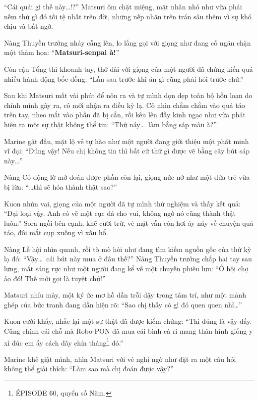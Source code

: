 \documentclass[../main.tex]{subfiles}
\begin{document}
``Cái quái gì thế này\dots!?'' Matsuri ôm chặt miệng, mặt nhăn nhó như vừa phải nếm thứ gì đó tồi tệ nhất trên đời, những nếp nhăn trên trán sâu thêm vì sự khó chịu và bất ngờ.

Nàng Thuyền trưởng nhảy cẫng lên, lo lắng gọi với giọng như đang cố ngăn chặn một thảm họa: ``\textbf{Matsuri-senpai à!}''

Còn cậu Tổng thì khoanh tay, thở dài với giọng của một người đã chứng kiến quá nhiều hành động bốc đồng: ``Lần sau trước khi ăn gì cũng phải hỏi trước chứ.''

\ct

Sau khi Matsuri mất vài phút để nôn ra và tự mình dọn dẹp toàn bộ hỗn loạn do chính mình gây ra, cô mới nhận ra điều kỳ lạ. Cô nhìn chằm chằm vào quả táo trên tay, nheo mắt vào phần đã bị cắn, rồi kêu lên đầy kinh ngạc như vừa phát hiện ra một sự thật không thể tin: ``Thứ náy\dots\ làm bằng sáp màu à?''

Marine gật đầu, mặt lộ vẻ tự hào như một người đang giới thiệu một phát minh vĩ đại: ``Đúng vậy! Nếu chị không tin thì bất cứ thứ gì được vẽ bằng cây bút sáp này\dots''

Nàng Cổ động lờ mờ đoán được phần còn lại, giọng nức nở như một đứa trẻ vừa bị lừa: ``\dots thì sẽ hóa thành thật sao?''

Kuon nhún vai, giọng của một người đã tự mình thử nghiệm và thấy kết quả: ``Đại loại vậy. Anh có vẽ một cục đá cho vui, không ngờ nó cũng thành thật luôn.'' Sora ngồi bên cạnh, khẽ cười trừ, vẻ mặt vẫn còn hơi áy náy về chuyện quả táo, đôi mắt cụp xuống vì xấu hổ.

Nàng Lễ hội nhìn quanh, rồi tò mò hỏi như đang tìm kiếm nguồn gốc của thứ kỳ lạ đó: ``Vậy\dots\ cái bút này mua ở đâu thế?'' Nàng Thuyền trưởng chắp hai tay sau lưng, mắt sáng rực như một người đang kể về một chuyến phiêu lưu: ``Ở hội chợ ảo đó! Thế mới gọi là tuyệt chứ!''

Matsuri nhíu mày, một ký ức mơ hồ dần trỗi dậy trong tâm trí, như một mảnh ghép của bức tranh đang dần hiện rõ: ``Sao chị thấy có gì đó quen quen nhỉ\dots''

Kuon cười khẩy, nhắc lại một sự thật đã được kiểm chứng: ``Thì đúng là vậy đấy. Cũng chính cái chỗ mà Robo-PON đã mua cái bình cà ri mang thân hình giống y xì đúc em ấy cách đây chín tháng\footnote{{\flaregothic ÉPISODE 60}, quyển số Năm.} đó.''

Marine khẽ giật mình, nhìn Matsuri với vẻ nghi ngờ như đặt ra một câu hỏi không thể giải thích: ``Làm sao mà chị đoán được vậy?''
\end{document}
